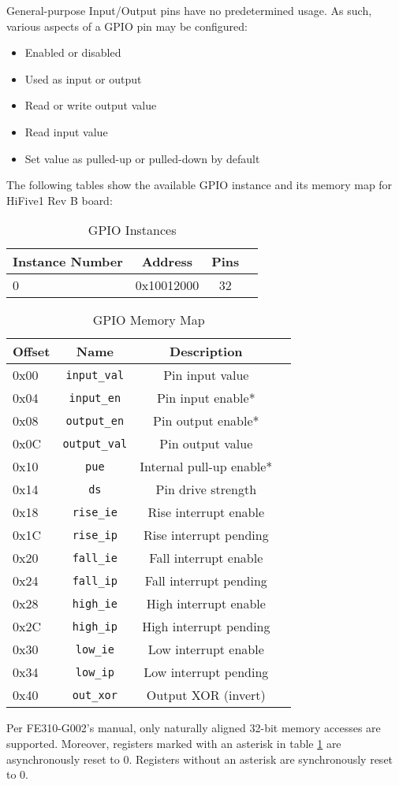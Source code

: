 General-purpose Input/Output pins have no predetermined usage. As such, various aspects of a GPIO pin may be configured:\cite{giometti2017gnu}
\begin{itemize}
    \item Enabled or disabled
    \item Used as input or output
    \item Read or write output value
    \item Read input value
    \item Set value as pulled-up or pulled-down by default
\end{itemize}

The following tables show the available GPIO instance and its memory map for HiFive1 Rev B board:
\begin{table}[H]
    \centering
    \begin{tabular}{| p{3cm} | c | c | p{3cm} |}
        \hline
        \textbf{Instance Number} & \textbf{Address} & \textbf{Pins}\\
        \hline
        \hline
        0 & 0x10012000 & 32\\
        \hline
    \end{tabular}
    \caption{GPIO Instances}
\end{table}

\begin{table}[H]
    \centering
    \begin{tabular}{| p{3cm} | c | c | p{3cm} |}
        \hline
        \textbf{Offset} & \textbf{Name} & \textbf{Description}\\
        \hline
        \hline
        0x00 & \lstinline|input_val| & Pin input value\\
        0x04 & \lstinline|input_en| & Pin input enable*\\
        0x08 & \lstinline|output_en| & Pin output enable*\\
        0x0C & \lstinline|output_val| & Pin output value\\
        0x10 & \lstinline|pue| & Internal pull-up enable*\\
        0x14 & \lstinline|ds| & Pin drive strength\\
        0x18 & \lstinline|rise_ie| & Rise interrupt enable\\
        0x1C & \lstinline|rise_ip| & Rise interrupt pending\\
        0x20 & \lstinline|fall_ie| & Fall interrupt enable\\
        0x24 & \lstinline|fall_ip| & Fall interrupt pending\\
        0x28 & \lstinline|high_ie| & High interrupt enable\\
        0x2C & \lstinline|high_ip| & High interrupt pending\\
        0x30 & \lstinline|low_ie| & Low interrupt enable\\
        0x34 & \lstinline|low_ip| & Low interrupt pending\\
        0x40 & \lstinline|out_xor| & Output XOR (invert)\\
        \hline
    \end{tabular}
    \caption{GPIO Memory Map}
    \label{tab:gpio_memory_map}
\end{table}

Per FE310-G002's manual\cite{fe310g002man}, only naturally aligned 32-bit memory accesses are supported. Moreover, registers marked with an asterisk in table \ref{tab:gpio_memory_map} are asynchronously reset to 0. Registers without an asterisk are synchronously reset to 0.